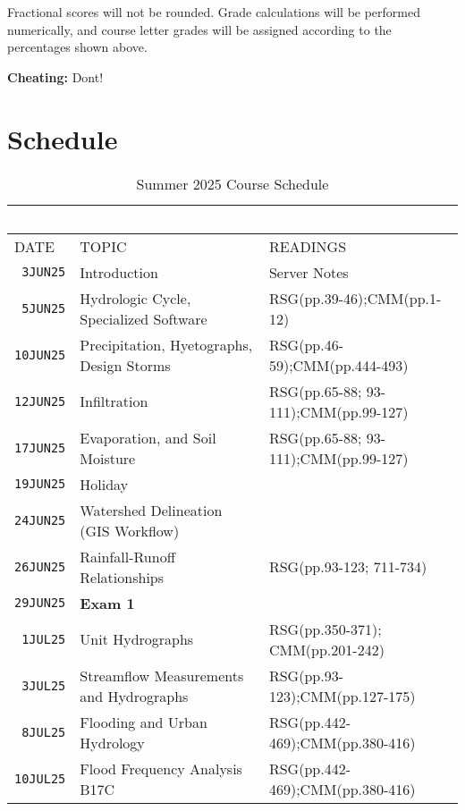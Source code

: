 \documentclass[12pt]{article}
\begin{document}
Fractional scores will not be rounded. Grade calculations will be performed numerically, and course letter grades will be assigned according to the percentages shown above.

\textbf{Cheating:} Dont!

\clearpage
\section*{Schedule}
\begin{table}[ht!]
   \centering
   \caption{Summer 2025 Course Schedule}
   \begin{tabular}{p{0.5in}p{3.0in}p{3.0in}} 
   ~ & ~ & ~  \\
\hline
DATE & TOPIC & READINGS  \\
\hline
\texttt{~3JUN25} & Introduction & Server Notes  \\ %
\texttt{~5JUN25} & Hydrologic Cycle, Specialized Software & RSG(pp.39-46);CMM(pp.1-12) \\ %
\texttt{10JUN25} & Precipitation, Hyetographs, Design Storms & RSG(pp.46-59);CMM(pp.444-493)\\ 
\texttt{12JUN25} & Infiltration & RSG(pp.65-88; 93-111);CMM(pp.99-127)\\ %
\texttt{17JUN25} & Evaporation, and Soil Moisture &  RSG(pp.65-88; 93-111);CMM(pp.99-127)\\ 
\texttt{19JUN25} & Holiday & \\ %
\texttt{24JUN25} & Watershed Delineation (GIS Workflow) & \\ 
\texttt{26JUN25} & Rainfall-Runoff Relationships & RSG(pp.93-123; 711-734)\\
\texttt{29JUN25} & \textbf{Exam 1} &  \\ %
\texttt{~1JUL25} & Unit Hydrographs & RSG(pp.350-371); CMM(pp.201-242)\\ %
\texttt{~3JUL25} & Streamflow Measurements and Hydrographs & RSG(pp.93-123);CMM(pp.127-175) \\ 
\texttt{~8JUL25} & Flooding and Urban Hydrology & RSG(pp.442-469);CMM(pp.380-416)\\ %
\texttt{10JUL25} & Flood Frequency Analysis B17C & RSG(pp.442-469);CMM(pp.380-416) \\   

\end{tabular}
\end{table}
\end{document}
